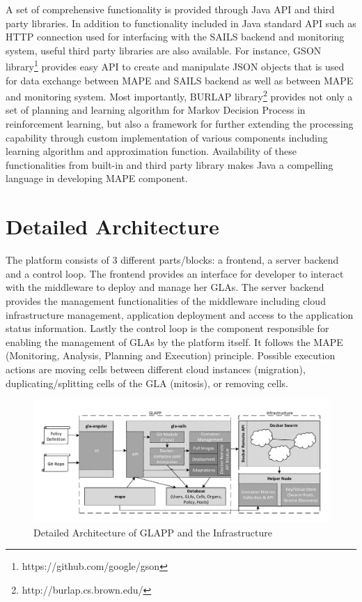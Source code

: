 \documentclass{seal_thesis}
\begin{document}
A set of comprehensive functionality is provided through Java API and third party libraries.
In addition to functionality included in Java standard API such as HTTP connection used for interfacing with the SAILS backend and monitoring system, useful third party libraries are also available.
For instance, GSON library\footnote{https://github.com/google/gson} provides easy API to create and manipulate JSON objects that is used for data exchange between MAPE and SAILS backend as well as between MAPE and monitoring system.
Most importantly, BURLAP library\footnote{http://burlap.cs.brown.edu/} provides not only a set of planning and learning algorithm for Markov Decision Process in reinforcement learning, but also a framework for further extending the processing capability through custom implementation of various components including learning algorithm and approximation function.
Availability of these functionalities from built-in and third party library makes Java a compelling language in developing MAPE component.


\section{Detailed Architecture}\label{sec:detailedArchitecture}
The platform consists of 3 different parts/blocks: a frontend, a server backend and a control loop.
The frontend provides an interface for developer to interact with the middleware to deploy and manage her GLAs.
The server backend provides the management functionalities of the middleware including cloud infrastructure management, application deployment and access to the application status information.
Lastly the control loop is the component responsible for enabling the management of GLAs by the platform itself.
It follows the MAPE (Monitoring, Analysis, Planning and Execution) principle.
Possible execution actions are moving cells between different cloud instances (migration), duplicating/splitting cells of the GLA (mitosis), or removing cells.

\begin{figure}[!ht]
\centering
	\includegraphics[width=\textwidth]{detailed_architecture.pdf}
	\caption{Detailed Architecture of GLAPP and the Infrastructure}
	\label{fig:detailed}
\end{figure}
\end{document}
